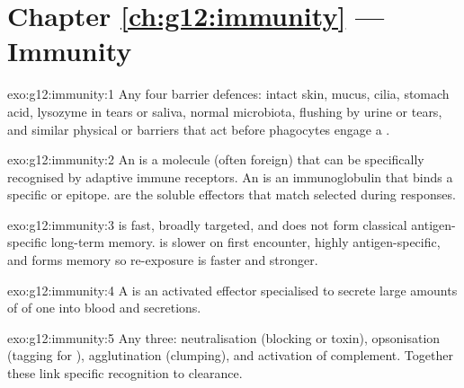 \section*{Chapter \ref{ch:g12:immunity} --- Immunity}

\begin{solution}{exo:g12:immunity:1}
Any four barrier defences: intact skin, mucus, cilia, stomach acid, lysozyme
in tears or saliva, normal microbiota, flushing by urine or tears, and similar
physical or  barriers that act before phagocytes engage a .
\end{solution}

\begin{solution}{exo:g12:immunity:2}
An  is a molecule (often foreign) that can be specifically recognised
by adaptive immune receptors. An  is an immunoglobulin  that
binds a specific  or epitope.  are the soluble effectors that
match  selected during  responses.
\end{solution}

\begin{solution}{exo:g12:immunity:3}
 is fast, broadly targeted, and does not form classical
antigen-specific long-term memory.  is slower on first
encounter, highly antigen-specific, and forms memory so re-exposure is faster
and stronger.
\end{solution}

\begin{solution}{exo:g12:immunity:4}
A  is an activated  effector specialised to secrete large
amounts of  of one  into blood and secretions.
\end{solution}

\begin{solution}{exo:g12:immunity:5}
Any three: neutralisation (blocking  or toxin), opsonisation (tagging
for ), agglutination (clumping), and activation of complement.
Together these link specific recognition to clearance.
\end{solution}

